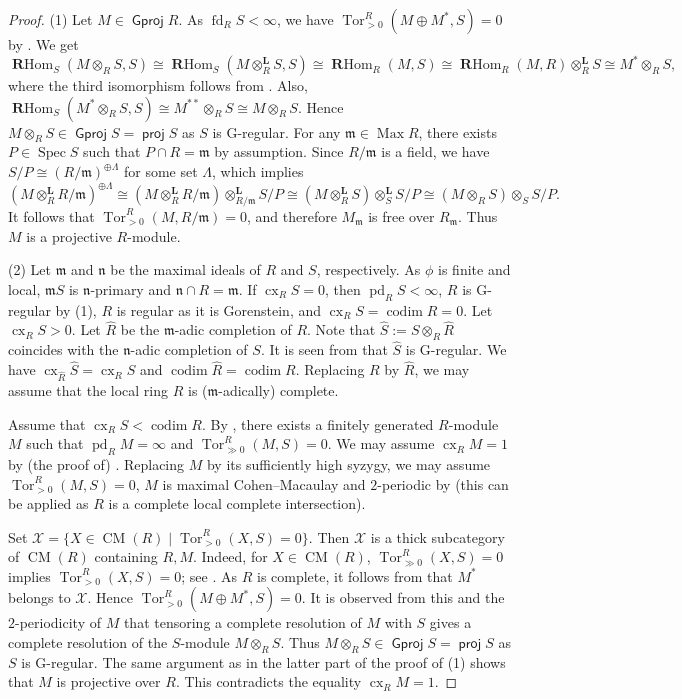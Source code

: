 \documentclass{amsart}
\theoremstyle{definition}
\theoremstyle{remark}
\numberwithin{equation}{thm}
\def\cm{\operatorname{CM}}
\def\codim{\operatorname{codim}}
\def\cx{\operatorname{cx}}
\def\fd{\operatorname{fd}}
\def\Gproj{\operatorname{\mathsf{Gproj}}}
\def\m{\mathfrak{m}}
\def\Max{\operatorname{Max}}
\def\n{\mathfrak{n}}
\def\pd{\operatorname{pd}}
\def\proj{\operatorname{\mathsf{proj}}}
\def\RHom{\operatorname{\mathbf{R}Hom}}
\def\spec{\operatorname{Spec}}
\def\Tor{\operatorname{Tor}}
\def\X{\mathcal{X}}
\begin{document}
\begin{proof}
(1) Let $M \in \Gproj R$.
As $\fd_R S < \infty$, we have $\Tor_{>0}^R(M\oplus M^*,S)=0$ by \cite[Theorem 5.3.6]{Chr}.
We get
$$
\RHom_S(M\otimes_R S,S)\cong \RHom_S(M\otimes_R^\mathbf{L} S,S)\cong \RHom_R(M,S)\cong \RHom_R(M,R)\otimes_R^\mathbf{L}S\cong M^*\otimes_R S,
$$
where the third isomorphism follows from \cite[A.4.23]{Chr}.
Also, $\RHom_S(M^*\otimes_R S,S)\cong M^{**}\otimes_R S\cong M\otimes_R S$.
Hence $M\otimes_R S \in \Gproj S=\proj S$ as $S$ is G-regular. For any $\m \in \Max R$, there exists $P \in \spec S$ such that $P\cap R=\m$ by assumption. Since $R/\m$ is a field, we have $S/P\cong(R/\m)^{\oplus \Lambda}$ for some set $\Lambda$, which implies 
$$
(M\otimes_R^\mathbf{L} R/\m)^{\oplus \Lambda}
\cong (M\otimes_R^\mathbf{L} R/\m) \otimes_{R/\m}^\mathbf{L} S/P
\cong (M\otimes_R^\mathbf{L} S)\otimes_S^\mathbf{L} S/P 
\cong (M\otimes_R S)\otimes_S S/P.
$$
It follows that $\Tor^R_{>0}(M, R/\m)=0$, and therefore $M_\m$ is free over $R_\m$.
Thus $M$ is a projective $R$-module.

(2) Let $\m$ and $\n$ be the maximal ideals of $R$ and $S$, respectively.
As $\phi$ is finite and local, $\m S$ is $\n$-primary and $\n\cap R=\m$.
If $\cx_R S=0$, then $\pd_R S<\infty$, $R$ is G-regular by (1), $R$ is regular as it is Gorenstein, and $\cx_R S=\codim R=0$.
Let $\cx_R S>0$.
Let $\widehat{R}$ be the $\m$-adic completion of $R$.
Note that $\widehat{S}:= S\otimes_R \widehat{R}$ coincides with the $\n$-adic completion of $S$.
It is seen from \cite[Corollary 4.7]{T08} that $\widehat S$ is G-regular.
We have $\cx_{\widehat R}\widehat{S}=\cx_R S$ and $\codim \widehat{R}=\codim R$.
Replacing $R$ by $\widehat{R}$, we may assume that the local ring $R$ is ($\m$-adically) complete.

Assume that $\cx_R S < \codim R$.
By \cite[Proposition 2.7]{CDT14}, there exists a finitely generated $R$-module $M$ such that $\pd_R M=\infty$ and $\Tor_{\gg0}^R(M,S)=0$.
We may assume $\cx_R M=1$ by (the proof of) \cite[Proposition 2.2(i)]{Ber}.
Replacing $M$ by its sufficiently high syzygy, we may assume $\Tor_{>0}^R(M,S)=0$, $M$ is maximal Cohen--Macaulay and $2$-periodic by \cite[Theorem 4.1]{E80} (this can be applied as $R$ is a complete local complete intersection).

Set $\X=\{X\in \cm(R) \mid \Tor_{>0}^R(X,S)=0\}$.
Then $\X$ is a thick subcategory of $\cm(R)$ containing $R,M$.
Indeed, for $X\in\cm(R)$, $\Tor_{\gg 0}^R(X,S)=0$ implies $\Tor_{>0}^R(X,S)=0$; see \cite[Theorem 9.3.6]{Avr}.
As $R$ is complete, it follows from \cite[Corollary 2.8]{S14} that $M^*$ belongs to $\X$.
Hence $\Tor_{>0}^R(M\oplus M^*,S)=0$.
It is observed from this and the $2$-periodicity of $M$ that tensoring a complete resolution of $M$ with $S$ gives a complete resolution of the $S$-module $M\otimes_R S$.
Thus $M\otimes_R S \in \Gproj S=\proj S$ as $S$ is G-regular.
The same argument as in the latter part of the proof of (1) shows that $M$ is projective over $R$.
This contradicts the equality $\cx_R M=1$.
\end{proof}
\end{document}
